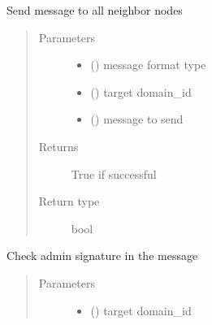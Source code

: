 \documentclass[letterpaper,10pt,english]{sphinxmanual}
\begin{document}
\begin{fulllineitems}
\begin{fulllineitems}
\end{fulllineitems}


\begin{fulllineitems}
\label{\detokenize{bbc1.core.bbc_network:bbc1.core.bbc_network.BBcNetwork.broadcast_message_in_network}}
Send message to all neighbor nodes
\begin{quote}\begin{description}
\item[{Parameters}] \leavevmode\begin{itemize}
\item {} 
 () \textendash{} message format type

\item {} 
 () \textendash{} target domain\_id

\item {} 
 () \textendash{} message to send

\end{itemize}

\item[{Returns}] \leavevmode
True if successful

\item[{Return type}] \leavevmode
bool

\end{description}\end{quote}

\end{fulllineitems}


\begin{fulllineitems}
\label{\detokenize{bbc1.core.bbc_network:bbc1.core.bbc_network.BBcNetwork.check_admin_signature}}
Check admin signature in the message
\begin{quote}\begin{description}
\item[{Parameters}] \leavevmode\begin{itemize}
\item {} 
 () \textendash{} target domain\_id


\end{itemize}
\end{description}
\end{quote}
\end{fulllineitems}
\end{fulllineitems}
\end{document}
